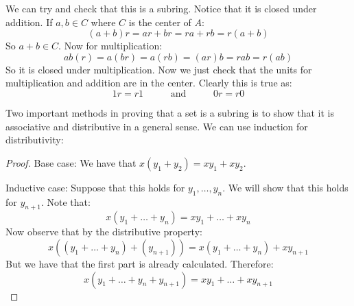 \documentclass{report}
\begin{document}
We can try and check that this is a subring. Notice that it is closed under addition. If $a, b \in C$ where $C$ is the center of $A$:
    \begin{equation*}
        (a + b)r = ar + br = ra + rb = r(a + b)
    \end{equation*}
So $a + b \in C$. Now for multiplication:
    \begin{equation*}
        ab(r) = a(br) = a(rb) = (ar)b = rab = r(ab)
    \end{equation*}
So it is closed under multiplication. Now we just check that the units for multiplication and addition are in the center. Clearly this is true as:
    \begin{equation*}
        1r = r1 \hspace{30pt} \text{ and } \hspace{30pt} 0r = r0
    \end{equation*}

Two important methods in proving that a set is a subring is to show that it is associative and distributive in a general sense. We can use induction for distributivity:
    \begin{proof}
        Base case: We have that $x(y_1 + y_{2}) = xy_{1} + xy_{2}$.

        Inductive case: Suppose that this holds for $y_{1}, \ldots, y_{n}$. We will show that this holds for $y_{n + 1}$. Note that:
            \begin{equation*}
                x(y_{1} + \ldots + y_{n}) = xy_{1} + \ldots + xy_{n}
            \end{equation*}
        Now observe that by the distributive property:
            \begin{equation*}
                x((y_{1} + \ldots + y_{n}) + (y_{n + 1})) = x(y_{1} + \ldots + y_{n}) + xy_{n + 1}
            \end{equation*}
        But we have that the first part is already calculated. Therefore:
            \begin{equation*}
                x(y_{1} + \ldots + y_{n} + y_{n + 1}) = xy_{1} + \ldots + xy_{n + 1}
            \end{equation*}
    \end{proof}
\end{document}
